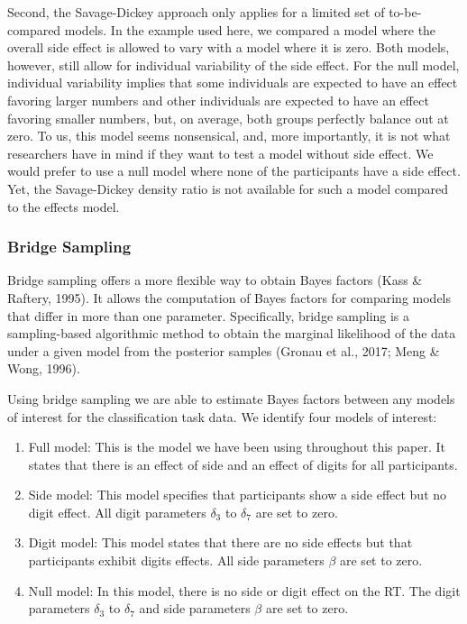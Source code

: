 \documentclass[
  english,
  doc,floatsintext]{apa6}
\providecommand{\tightlist}{%
  \setlength{\itemsep}{0pt}\setlength{\parskip}{0pt}}
\begin{document}
Second, the Savage-Dickey approach only applies for a limited set of to-be-compared models. In the example used here, we compared a model where the overall side effect is allowed to vary with a model where it is zero. Both models, however, still allow for individual variability of the side effect. For the null model, individual variability implies that some individuals are expected to have an effect favoring larger numbers and other individuals are expected to have an effect favoring smaller numbers, but, on average, both groups perfectly balance out at zero. To us, this model seems nonsensical, and, more importantly, it is not what researchers have in mind if they want to test a model without side effect. We would prefer to use a null model where none of the participants have a side effect. Yet, the Savage-Dickey density ratio is not available for such a model compared to the effects model.

\hypertarget{bridge-sampling}{%
\subsubsection{Bridge Sampling}\label{bridge-sampling}}

Bridge sampling offers a more flexible way to obtain Bayes factors (Kass \& Raftery, 1995). It allows the computation of Bayes factors for comparing models that differ in more than one parameter. Specifically, bridge sampling is a sampling-based algorithmic method to obtain the marginal likelihood of the data under a given model from the posterior samples (Gronau et al., 2017; Meng \& Wong, 1996).

Using bridge sampling we are able to estimate Bayes factors between any models of interest for the classification task data. We identify four models of interest:

\begin{enumerate}
\def\labelenumi{\arabic{enumi}.}
\tightlist
\item
  Full model: This is the model we have been using throughout this paper. It states that there is an effect of side and an effect of digits for all participants.
\item
  Side model: This model specifies that participants show a side effect but no digit effect. All digit parameters \(\delta_{3}\) to \(\delta_{7}\) are set to zero.
\item
  Digit model: This model states that there are no side effects but that participants exhibit digits effects. All side parameters \(\beta\) are set to zero.
\item
  Null model: In this model, there is no side or digit effect on the RT. The digit parameters \(\delta_{3}\) to \(\delta_{7}\) and side parameters \(\beta\) are set to zero.
\end{enumerate}
\end{document}
